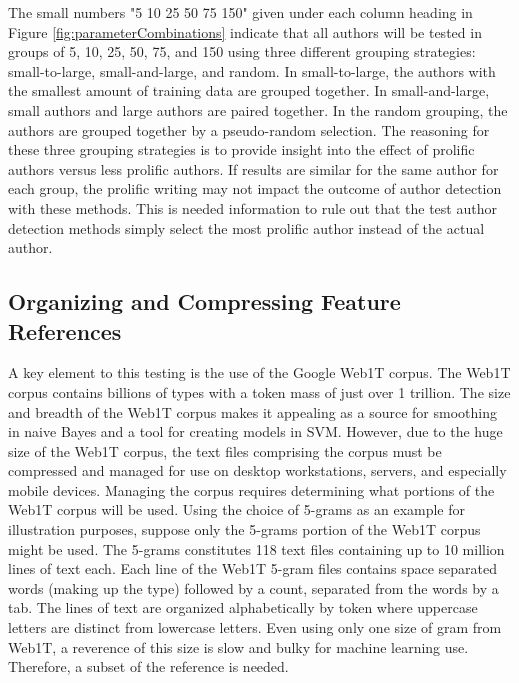 The small numbers "5 10 25 50 75 150" given under each column heading in Figure \ref{fig:parameterCombinations} indicate that all authors will be tested in groups of 5, 10, 25, 50, 75, and 150 using three different grouping strategies: small-to-large, small-and-large, and random. In small-to-large, the authors with the smallest amount of training data are grouped together.  In small-and-large, small authors and large authors are paired together.  In the random grouping, the authors are grouped together by a pseudo-random selection.  The reasoning for these three grouping strategies is to provide insight into the effect of prolific authors versus less prolific authors.  If results are similar for the same author for each group, the prolific writing may not impact the outcome of author detection with these methods.  This is needed information to rule out that the test author detection methods simply select the most prolific author instead of the actual author.

	\subsection{Organizing and Compressing Feature References} A key element to this testing is the use of the Google Web1T corpus.  The Web1T corpus contains billions of types with a token mass of just over 1 trillion.  The size and breadth of the Web1T corpus makes it appealing as a source for smoothing in naive Bayes and a tool for creating models in SVM. However, due to the huge size of the Web1T corpus, the text files comprising the corpus must be compressed and managed for use on desktop workstations, servers, and especially mobile devices.  Managing the corpus requires determining what portions of the Web1T corpus will be used.  Using the choice of 5-grams as an example for illustration purposes, suppose only the 5-grams portion of the Web1T corpus might be used.  The 5-grams constitutes 118 text files containing up to 10 million lines of text each. Each line of the Web1T 5-gram files contains space separated words (making up the type) followed by a count, separated from the words by a tab.  The lines of text are organized alphabetically by token where uppercase letters are distinct from lowercase letters. Even using only one size of gram from Web1T, a reverence of this size is slow and bulky for machine learning use.  Therefore, a subset of the reference is needed.
